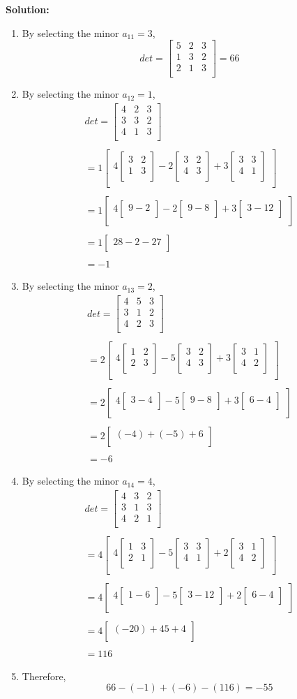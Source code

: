 \documentclass[12pt]{article}
\newcommand{\sol} {\textbf{Solution:}}
\newcommand{\matx}[1] {
\begin{bmatrix}
  #1 \\
\end{bmatrix}
}
\newcommand{\matxx}[2] {
\begin{bmatrix}
  #1 \\
  #2 \\
\end{bmatrix}
}
\newcommand{\matxxx}[3] {
\begin{bmatrix}
  #1 \\
  #2 \\
  #3 \\
\end{bmatrix}
}
\begin{document}
\sol

\begin{enumerate}
  \item By selecting the minor \(a_{11} = 3\),
  \[
    det = \matxxx{5&2&3}{1&3&2}{2&1&3} = 66
  \]
  \item By selecting the minor \(a_{12} = 1\),
  \[
    \begin{matrix}
      det = \matxxx{4&2&3}{3&3&2}{4&1&3} \\ \\
      = 1\matx{4\matxx{3&2}{1&3}-2\matxx{3&2}{4&3}+3\matxx{3&3}{4&1}} \\ \\
      = 1\matx{4\matx{9 - 2} - 2 \matx{9 - 8} + 3 \matx{3 - 12}} \\ \\
      = 1\matx{28 - 2 - 27} \\ \\
      = -1
    \end{matrix}
  \]
  \item By selecting the minor \(a_{13} = 2\),
  \[
    \begin{matrix}
      det = \matxxx{4&5&3}{3&1&2}{4&2&3} \\ \\
      = 2\matx{4\matxx{1&2}{2&3} - 5\matxx{3&2}{4&3} + 3\matxx{3&1}{4&2}} \\ \\
      = 2\matx{4\matx{3 - 4} - 5\matx{9 - 8} + 3\matx{6 - 4}} \\ \\
      = 2\matx{(-4) + (-5) + 6} \\ \\
      = -6
    \end{matrix}
  \]
  \item By selecting the minor \(a_{14} = 4\),
  \[
  \begin{matrix}
    det = \matxxx{4 & 3 & 2}{3 & 1 & 3}{4 & 2 & 1} \\ \\
    = 4\matx{4\matxx{1&3}{2&1}-5\matxx{3&3}{4&1}+2\matxx{3&1}{4&2}} \\ \\
    = 4\matx{4\matx{1-6}-5\matx{3-12}+2\matx{6-4}} \\ \\
    = 4\matx{(-20) + 45 + 4} \\ \\
    = 116
  \end{matrix}
  \]
  \item Therefore, \[66 - (-1) + (-6) - (116) = -55\]
\end{enumerate}
\end{document}
